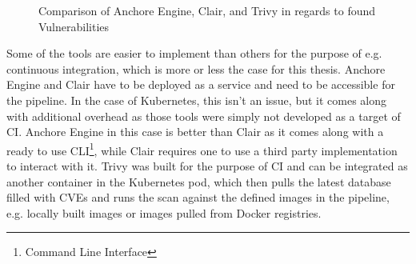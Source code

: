 \begin{figure}[]
    \centering
    \def\stackalignment{r}
    \caption{Comparison of Anchore Engine, Clair, and Trivy in regards to found Vulnerabilities}
    \label{fig:docker_comparison}
\end{figure}

Some of the tools are easier to implement than others for the purpose of e.g. continuous integration, which is more or less the case for this thesis. Anchore Engine and Clair have to be deployed as a service and need to be accessible for the pipeline. In the case of Kubernetes, this isn't an issue, but it comes along with additional overhead as those tools were simply not developed as a target of CI. Anchore Engine in this case is better than Clair as it comes along with a ready to use CLI\footnote{Command Line Interface}, while Clair requires one to use a third party implementation to interact with it. Trivy was built for the purpose of CI and can be integrated as another container in the Kubernetes pod, which then pulls the latest database filled with CVEs and runs the scan against the defined images in the pipeline, e.g. locally built images or images pulled from Docker registries.

